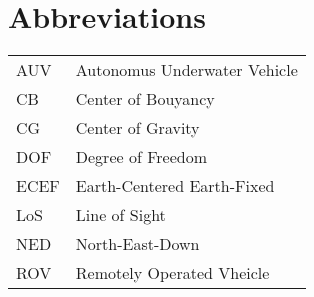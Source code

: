 \chapter{Abbreviations}
\begin{center}
\begin{tabular}{|l|l|}
\hline
AUV & Autonomus Underwater Vehicle \\
CB & Center of Bouyancy\\
CG & Center of Gravity \\
DOF & Degree of Freedom \\
ECEF & Earth-Centered Earth-Fixed \\
LoS & Line of Sight\\
NED & North-East-Down \\
ROV & Remotely Operated Vheicle \\
\hline
\end{tabular}
\end{center}
